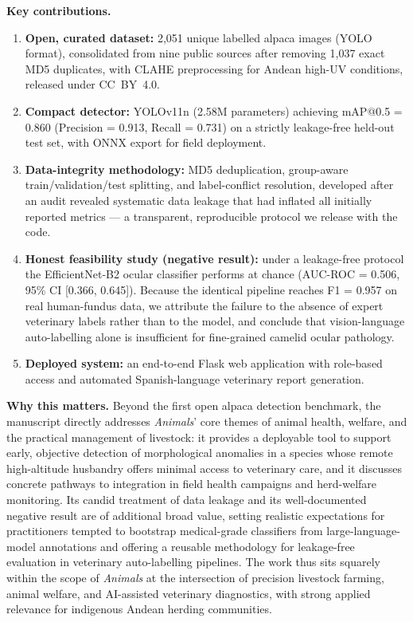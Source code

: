 \documentclass[12pt, letterpaper]{article}
\begin{document}
\textbf{Key contributions.}
\begin{enumerate}
  \item \textbf{Open, curated dataset:} 2,051 unique labelled alpaca images (YOLO
        format), consolidated from nine public sources after removing 1,037 exact
        MD5 duplicates, with CLAHE preprocessing for Andean high-UV conditions,
        released under CC~BY~4.0.
  \item \textbf{Compact detector:} YOLOv11n (2.58M parameters) achieving
        mAP@0.5 = 0.860 (Precision = 0.913, Recall = 0.731) on a strictly
        leakage-free held-out test set, with ONNX export for field deployment.
  \item \textbf{Data-integrity methodology:} MD5 deduplication, group-aware
        train/validation/test splitting, and label-conflict resolution, developed
        after an audit revealed systematic data leakage that had inflated all
        initially reported metrics --- a transparent, reproducible protocol we
        release with the code.
  \item \textbf{Honest feasibility study (negative result):} under a leakage-free
        protocol the EfficientNet-B2 ocular classifier performs at chance
        (AUC-ROC = 0.506, 95\% CI [0.366, 0.645]). Because the identical pipeline
        reaches F1 = 0.957 on real human-fundus data, we attribute the failure to
        the absence of expert veterinary labels rather than to the model, and
        conclude that vision-language auto-labelling alone is insufficient for
        fine-grained camelid ocular pathology.
  \item \textbf{Deployed system:} an end-to-end Flask web application with role-based
        access and automated Spanish-language veterinary report generation.
\end{enumerate}

\textbf{Why this matters.}
Beyond the first open alpaca detection benchmark, the manuscript directly addresses
\textit{Animals}' core themes of animal health, welfare, and the practical management of
livestock: it provides a deployable tool to support early, objective detection of
morphological anomalies in a species whose remote high-altitude husbandry offers minimal
access to veterinary care, and it discusses concrete pathways to integration in field
health campaigns and herd-welfare monitoring. Its candid treatment of data leakage and its
well-documented negative result are of additional broad value, setting realistic
expectations for practitioners tempted to bootstrap medical-grade classifiers from
large-language-model annotations and offering a reusable methodology for leakage-free
evaluation in veterinary auto-labelling pipelines. The work thus sits squarely within the
scope of \textit{Animals} at the intersection of precision livestock farming, animal
welfare, and AI-assisted veterinary diagnostics, with strong applied relevance for
indigenous Andean herding communities.
\end{document}
